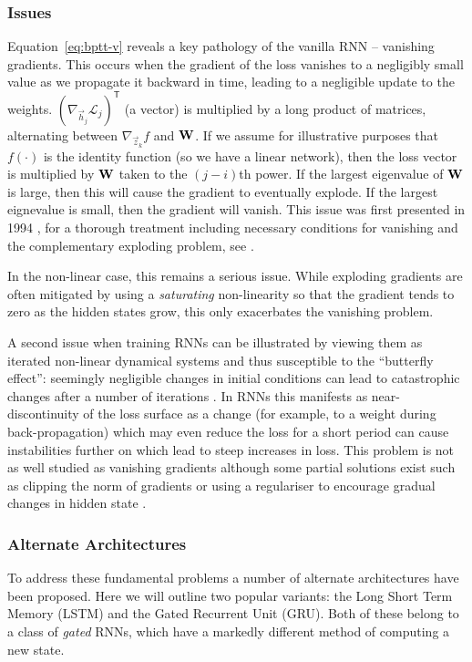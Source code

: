 \subsubsection{Issues}
Equation~\eqref{eq:bptt-v} reveals a key pathology of the vanilla RNN -- vanishing gradients.
This occurs when the gradient of the loss vanishes to a negligibly small value as we
propagate it backward in time, leading to a negligible update to the weights.
 \((\nabla_{\vec{h}_j}\mathcal{L}_j)^\mathsf{T}\) (a vector) is multiplied by a long product of
 matrices, alternating between \(\nabla_{\vec{z}_k} f\) and \(\mathbf{W}\). If we assume for
 illustrative purposes that \(f(\cdot)\) is the identity function (so we have a linear network),
then the loss vector is multiplied by \(\mathbf{W}\) taken to the \((j-i)\)th power. If the largest
eigenvalue of \(\mathbf{W}\) is large, then this will cause the gradient to eventually explode.
If the largest eignevalue is small, then the gradient will vanish. This issue was first presented
in 1994 \autocite{Bengio1994}, for a thorough treatment including necessary conditions 
for vanishing and the complementary exploding problem, see \autocite{Pascanu2012}.

In the non-linear case, this remains a serious issue. While exploding gradients are often
mitigated by using a \emph{saturating} non-linearity so that the gradient tends to zero as the
hidden states grow, this only exacerbates the vanishing problem. 

A second issue when training RNNs can be illustrated by viewing them as iterated non-linear	
dynamical systems and thus susceptible to the ``butterfly effect'': seemingly negligible changes
in initial conditions can lead to catastrophic changes after a number of iterations
\autocite{Lorenz1963}. In RNNs this manifests as near-discontinuity of the loss surface
\autocite{Pascanu2012} as a change (for example, to a weight during back-propagation) which may
even reduce the loss for a short period can cause instabilities further on which lead to steep
increases in loss. This problem is not as well studied as vanishing gradients although some
partial solutions exist such as clipping the norm of gradients \autocite{Pascanu2012} or
using a regulariser to encourage gradual changes in hidden state \autocite{Krueger2016}.

\subsubsection{Alternate Architectures}
To address these fundamental problems a number of alternate architectures have been proposed.
Here we will outline two popular variants: the Long Short Term Memory (LSTM) and the Gated
Recurrent Unit (GRU). Both of these belong to a class of \emph{gated} RNNs, which have a
markedly different method of computing a new state.

